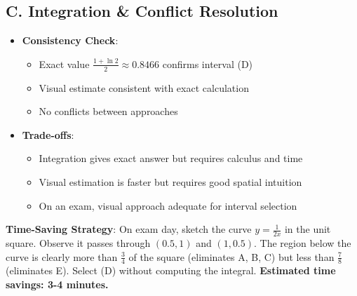 \documentclass[11pt]{article}
\begin{document}
\begin{techniquesbox}
\subsection*{C. Integration \& Conflict Resolution}
\begin{itemize}[leftmargin=*]
    \item \textbf{Consistency Check}: 
    \begin{itemize}
        \item Exact value $\frac{1 + \ln 2}{2} \approx 0.8466$ confirms interval (D)
        \item Visual estimate consistent with exact calculation
        \item No conflicts between approaches
    \end{itemize}
    
    \item \textbf{Trade-offs}: 
    \begin{itemize}
        \item Integration gives exact answer but requires calculus and time
        \item Visual estimation is faster but requires good spatial intuition
        \item On an exam, visual approach adequate for interval selection
    \end{itemize}
\end{itemize}
\end{techniquesbox}

\begin{protip}
\textbf{Time-Saving Strategy}: On exam day, sketch the curve $y = \frac{1}{2x}$ in the unit square. Observe it passes through $(0.5, 1)$ and $(1, 0.5)$. The region below the curve is clearly more than $\frac{3}{4}$ of the square (eliminates A, B, C) but less than $\frac{7}{8}$ (eliminates E). Select (D) without computing the integral. \textbf{Estimated time savings: 3-4 minutes.}
\end{protip}
\end{document}
